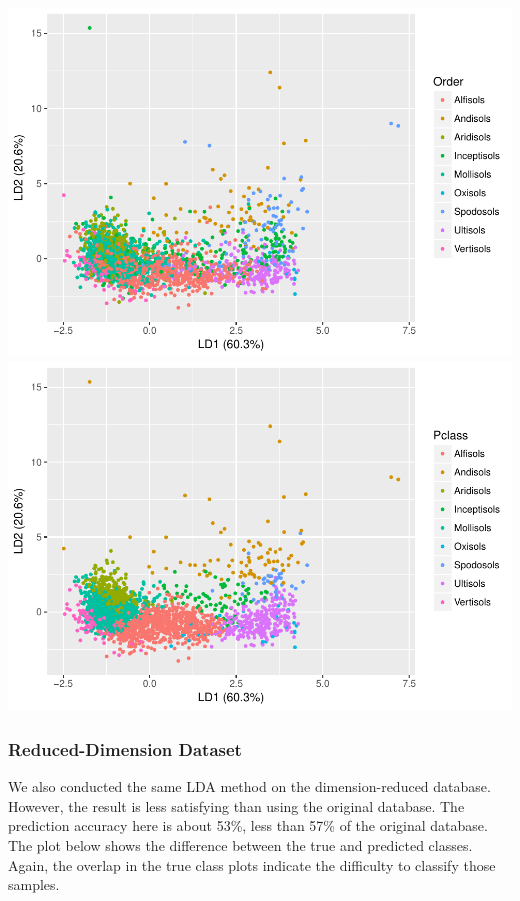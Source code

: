 \documentclass[]{article}
\begin{document}
\includegraphics{Project1_files/figure-latex/lda vis - FEI-1.pdf}
\includegraphics{Project1_files/figure-latex/lda vis - FEI-2.pdf}

\subsubsection{Reduced-Dimension
Dataset}\label{reduced-dimension-dataset}

We also conducted the same LDA method on the dimension-reduced database.
However, the result is less satisfying than using the original database.
The prediction accuracy here is about 53\%, less than 57\% of the
original database. The plot below shows the difference between the true
and predicted classes. Again, the overlap in the true class plots
indicate the difficulty to classify those samples.
\end{document}
